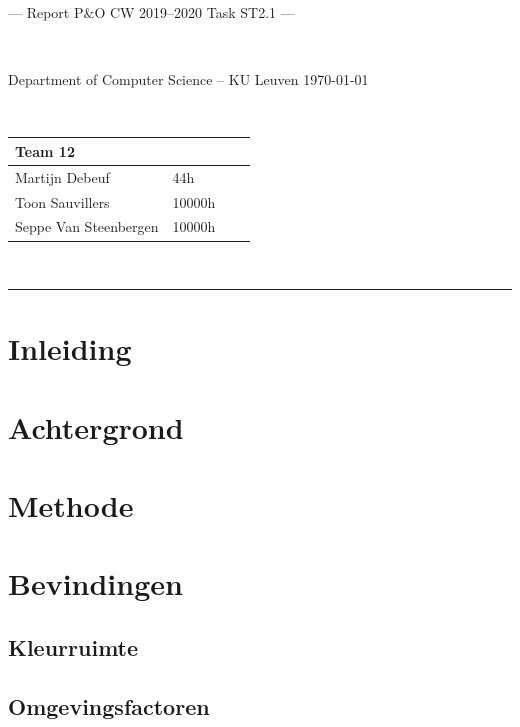 \documentclass[a4paper,11pt]{article}
\begin{document}
\noindent
\colorbox[HTML]{52BDEC}{\bfseries\parbox{\textwidth}{\centering\large
  --- Report P\&O CW 2019--2020 Task ST2.1 ---
}}
\\[-1mm]
\colorbox[HTML]{00407A}{\bfseries\color{white}\parbox{\textwidth}{
  Department of Computer Science -- KU Leuven
  \hfill
  \today
}}
\\

\smallskip

\noindent
\begin{tabular}{*4l}
\toprule
\multicolumn{2}{l}{\large\textbf{Team 12}} \\
\midrule
Martijn Debeuf &  44h\\ %
Toon Sauvillers &  10000h\\
Seppe Van Steenbergen & 10000h \\
\bottomrule
\hline
\end{tabular}\\

\noindent
{\color[HTML]{52BDEC} \rule{\linewidth}{1mm} }

\tableofcontents
\newpage
\section{Inleiding}\label{sec:inleiding}
	

\section{Achtergrond}\label{sec:achtergrond}
	

\section{Methode}\label{sec:methode}
	

\section{Bevindingen}\label{sec:bevindingen}
	

	\subsection{Kleurruimte}\label{subsec:kleurruimte}
		
	\subsection{Omgevingsfactoren}\label{subsec:omgevingsfactoren}
		
	
\end{document}
